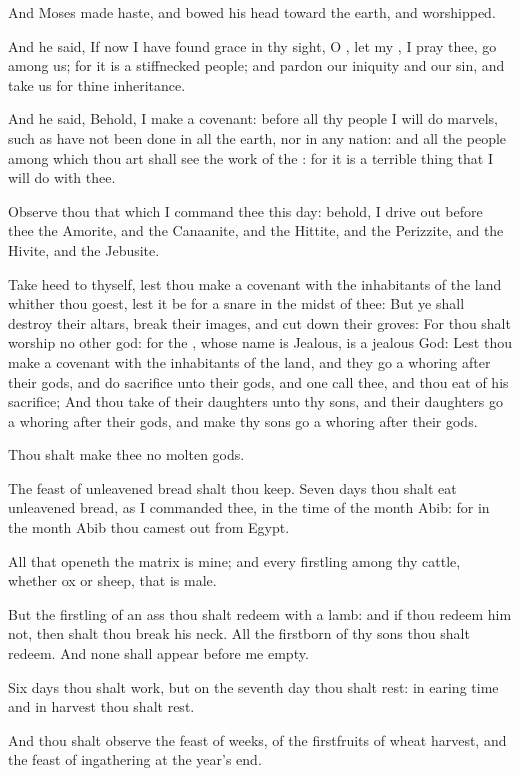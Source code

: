\verse And Moses made haste, and bowed his head toward the earth, and
worshipped.

\verse And he said, If now I have found grace in thy sight, O \LORD, let
my \LORD, I pray thee, go among us; for it is a stiffnecked people; and
pardon our iniquity and our sin, and take us for thine inheritance.

\verse And he said, Behold, I make a covenant: before all thy people I
will do marvels, such as have not been done in all the earth, nor in
any nation: and all the people among which thou art shall see the work
of the \LORD: for it is a terrible thing that I will do with thee.

\verse Observe thou that which I command thee this day: behold, I drive
out before thee the Amorite, and the Canaanite, and the Hittite, and
the Perizzite, and the Hivite, and the Jebusite.

\verse Take heed to thyself, lest thou make a covenant with the
inhabitants of the land whither thou goest, lest it be for a snare in
the midst of thee: \verse But ye shall destroy their altars, break
their images, and cut down their groves: \verse For thou shalt worship
no other god: for the \LORD, whose name is Jealous, is a jealous God:
\verse Lest thou make a covenant with the inhabitants of the land, and
they go a whoring after their gods, and do sacrifice unto their gods,
and one call thee, and thou eat of his sacrifice; \verse And thou take
of their daughters unto thy sons, and their daughters go a whoring
after their gods, and make thy sons go a whoring after their gods.

\verse Thou shalt make thee no molten gods.

\verse The feast of unleavened bread shalt thou keep. Seven days thou
shalt eat unleavened bread, as I commanded thee, in the time of the
month Abib: for in the month Abib thou camest out from Egypt.

\verse All that openeth the matrix is mine; and every firstling among
thy cattle, whether ox or sheep, that is male.

\verse But the firstling of an ass thou shalt redeem with a lamb: and
if thou redeem him not, then shalt thou break his neck. All the
firstborn of thy sons thou shalt redeem. And none shall appear before
me empty.

\verse Six days thou shalt work, but on the seventh day thou shalt
rest: in earing time and in harvest thou shalt rest.

\verse And thou shalt observe the feast of weeks, of the firstfruits of
wheat harvest, and the feast of ingathering at the year's end.


